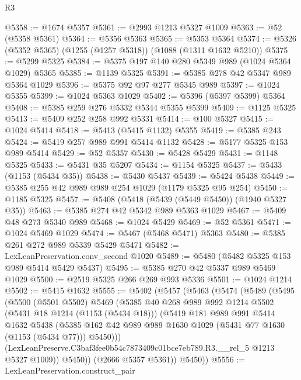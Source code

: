 \begin{lexlean}{R3}
\begin{coremodule}
@5358 := @1674 @5357
@5361 := @2993 @1213 @5327 @1009
@5363 := @52 (@5358 @5361)
@5364 := @5356 @5363
@5365 := @5353 @5364
@5374 := @5326 (@5352 @5365) (@1255 (@1257 @5318)) (@1088 (@1311 @1632 @5210))
@5375 := @5299 @5325
@5384 := @5375 @197 @140 @280 @5349 @989 (@1024 @5364 @1029) @5365
@5385 := @1139 @5325
@5391 := @5385 @278 @42 @5347 @989 @5364 @1029
@5396 := @5375 @92 @97 @277 @5345 @989
@5397 := @1024 @5355
@5399 := @1024 @5363 @1029
@5402 := @5396 (@5397 @5399) @5364
@5408 := @5385 @259 @276 @5332 @5344 @5355 @5399
@5409 := @1125 @5325
@5413 := @5409 @252 @258 @992 @5331
@5414 := @100 @5327
@5415 := @1024 @5414
@5418 := @5413 (@5415 @1132) @5355
@5419 := @5385 @243
@5424 := @5419 @257 @989 @991 @5414 @1132
@5428 := @5177 @5325 @153 @989 @5414
@5429 := @52 @5357
@5430 := @5428 @5429
@5431 := @1148 @5325
@5433 := @5431 @35 @5207
@5434 := @1154 @5325
@5437 := @5433 (@1153 (@5434 @35))
@5438 := @5430 @5437
@5439 := @5424 @5438
@5449 := @5385 @255 @42 @989 @989 @254 @1029 (@1179 @5325 @95 @254)
@5450 := @1185 @5325
@5457 := @5408 (@5418 (@5439 (@5449 @5450)) (@1940 @5327 @35))
@5463 := @5385 @274 @42 @5342 @989 @5363 @1029
@5467 := @5409 @48 @273 @5340 @989
@5468 := @1024 @5429
@5469 := @52 @5361
@5471 := @1024 @5469 @1029
@5474 := @5467 (@5468 @5471) @5363
@5480 := @5385 @261 @272 @989 @5339 @5429 @5471
@5482 := LexLeanPreservation.conv_second @1020
@5489 := @5480 (@5482 @5325 @153 @989 @5414 @5429 @5437)
@5495 := @5385 @270 @42 @5337 @989 @5469 @1029
@5500 := @2519 @5325 @266 @269 @993 @5336
@5501 := @1024 @1214
@5502 := @5415 @1632
@5555 := @5402
    (@5457
      (@5463
        (@5474
          (@5489
            (@5495
              (@5500
                (@5501 @5502)
                @5469
                (@5385
                  @40
                  @268
                  @989
                  @992
                  @1214
                  @5502
                  (@5431 @18 @1214 (@1153 (@5434 @18)))
                  (@5419
                    @181
                    @989
                    @991
                    @5414
                    @1632
                    @5438
                    (@5385
                      @162
                      @42
                      @989
                      @989
                      @1630
                      @1029
                      (@5431 @77 @1630 (@1153 (@5434 @77)))
                      @5450)))
                (LexLeanPreserve.C3baf3fee0b54c7873409c01bce7eb789.R3.__rel_5 @1213 @5327 @1009))
              @5450))
          (@2666 @5357 @5361))
        @5450))
@5556 := LexLeanPreservation.construct_pair

\end{coremodule}
\end{lexlean}
